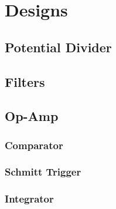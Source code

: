 \section{Designs}
\subsection{Potential Divider}
\subsection{Filters}
\subsection{Op-Amp}
\subsubsection{Comparator}
\subsubsection{Schmitt Trigger}
\subsubsection{Integrator}
